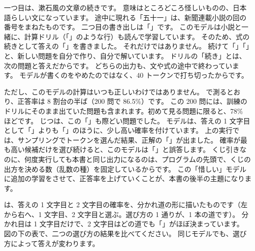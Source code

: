 
一つ目は、漱石風の文章の続きです。
意味はところどころ怪しいものの、日本語らしい文になっています。
途中に現れる「五十一」は、新聞連載小説の回の番号をまねたものです。
二つ目の書き出しは「」です。
このモデルは小説と一緒に、計算ドリル（「」のような行）も読んで学習しています。
そのため、式の続きとして答えの「」を書きました。
それだけではありません。
続けて「」「」と、新しい問題を自分で作り、自分で解いています。
ドリルの「続き」とは、次の問題と答えだからです。
どちらの出力も、文や式の途中で終わっています。
モデルが書くのをやめたのではなく、40 トークンで打ち切ったからです。

ただし、このモデルの計算はいつも正しいわけではありません。
で測るとおり、正答率は 8 割台の半ば（200 問で 86.5\%）です。
この 200 問には、訓練のドリルにそのまま出ていた問題も含まれます。初めて見る問題に限ると、78\% ほどです。
じつは、この「」も際どい問題でした。
モデルは、答えの 1 文字目として「」よりも「」のほうに、少し高い確率を付けています。
上の実行では、サンプリングでトークンを選んだ結果、正解の「」が出ました。
確率が最も高い候補だけを選び続けると、このモデルは「」と誤答します。
くじ引きなのに、何度実行しても本書と同じ出力になるのは、プログラムの先頭で、くじの出方を決める数（乱数の種）を固定しているからです。
この「惜しい」モデルに追加の学習をさせて、正答率を上げていくことが、本書の後半の主題になります。

は、答えの 1 文字目と 2 文字目の確率を、分かれ道の形に描いたものです（左から右へ、1 文字目、2 文字目と選ぶ。選び方の 1 通りが、1 本の道です）。
分かれ目は 1 文字目だけで、2 文字目はどの道でも「」がほぼ決まっています。
図の下の表で、二つの選び方の結果を比べてください。
同じモデルでも、選び方によって答えが変わります。


